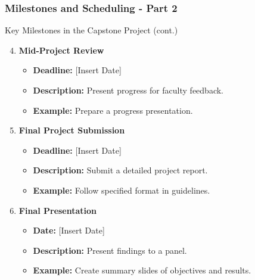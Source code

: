 \documentclass[aspectratio=169]{beamer}
\begin{document}
\begin{frame}[fragile]
  \frametitle{Milestones and Scheduling - Part 2}

  \begin{block}{Key Milestones in the Capstone Project (cont.)}
    \begin{enumerate}
      \setcounter{enumi}{3} %
      \item \textbf{Mid-Project Review}
        \begin{itemize}
          \item \textbf{Deadline:} [Insert Date]
          \item \textbf{Description:} Present progress for faculty feedback.
          \item \textbf{Example:} Prepare a progress presentation.
        \end{itemize}
      \item \textbf{Final Project Submission}
        \begin{itemize}
          \item \textbf{Deadline:} [Insert Date]
          \item \textbf{Description:} Submit a detailed project report.
          \item \textbf{Example:} Follow specified format in guidelines.
        \end{itemize}
      \item \textbf{Final Presentation}
        \begin{itemize}
          \item \textbf{Date:} [Insert Date]
          \item \textbf{Description:} Present findings to a panel.
          \item \textbf{Example:} Create summary slides of objectives and results.
        \end{itemize}
    \end{enumerate}
  \end{block}
\end{frame}
\end{document}
